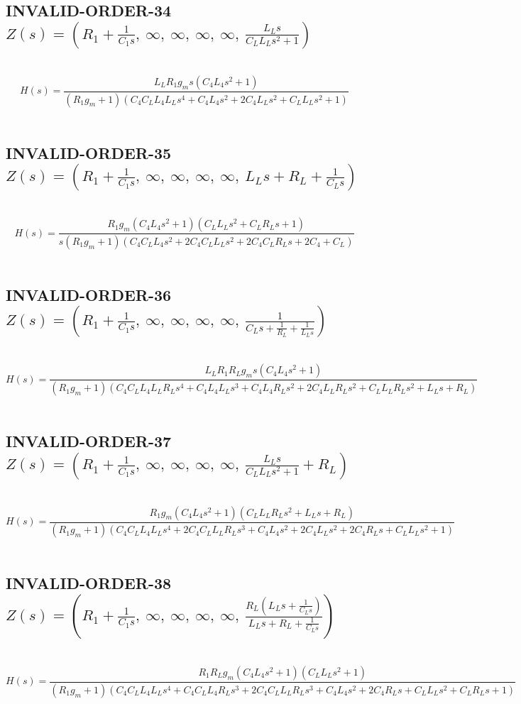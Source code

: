 \documentclass{article}
\begin{document}
\subsection{INVALID-ORDER-34 $Z(s) = \left( R_{1} + \frac{1}{C_{1} s}, \  \infty, \  \infty, \  \infty, \  \infty, \  \frac{L_{L} s}{C_{L} L_{L} s^{2} + 1}\right)$ } \ 
\textbf{\[H(s) = \frac{L_{L} R_{1} g_{m} s \left(C_{4} L_{4} s^{2} + 1\right)}{\left(R_{1} g_{m} + 1\right) \left(C_{4} C_{L} L_{4} L_{L} s^{4} + C_{4} L_{4} s^{2} + 2 C_{4} L_{L} s^{2} + C_{L} L_{L} s^{2} + 1\right)}\] } \ 
\subsection{INVALID-ORDER-35 $Z(s) = \left( R_{1} + \frac{1}{C_{1} s}, \  \infty, \  \infty, \  \infty, \  \infty, \  L_{L} s + R_{L} + \frac{1}{C_{L} s}\right)$ } \ 
\textbf{\[H(s) = \frac{R_{1} g_{m} \left(C_{4} L_{4} s^{2} + 1\right) \left(C_{L} L_{L} s^{2} + C_{L} R_{L} s + 1\right)}{s \left(R_{1} g_{m} + 1\right) \left(C_{4} C_{L} L_{4} s^{2} + 2 C_{4} C_{L} L_{L} s^{2} + 2 C_{4} C_{L} R_{L} s + 2 C_{4} + C_{L}\right)}\] } \ 
\subsection{INVALID-ORDER-36 $Z(s) = \left( R_{1} + \frac{1}{C_{1} s}, \  \infty, \  \infty, \  \infty, \  \infty, \  \frac{1}{C_{L} s + \frac{1}{R_{L}} + \frac{1}{L_{L} s}}\right)$ } \ 
\textbf{\[H(s) = \frac{L_{L} R_{1} R_{L} g_{m} s \left(C_{4} L_{4} s^{2} + 1\right)}{\left(R_{1} g_{m} + 1\right) \left(C_{4} C_{L} L_{4} L_{L} R_{L} s^{4} + C_{4} L_{4} L_{L} s^{3} + C_{4} L_{4} R_{L} s^{2} + 2 C_{4} L_{L} R_{L} s^{2} + C_{L} L_{L} R_{L} s^{2} + L_{L} s + R_{L}\right)}\] } \ 
\subsection{INVALID-ORDER-37 $Z(s) = \left( R_{1} + \frac{1}{C_{1} s}, \  \infty, \  \infty, \  \infty, \  \infty, \  \frac{L_{L} s}{C_{L} L_{L} s^{2} + 1} + R_{L}\right)$ } \ 
\textbf{\[H(s) = \frac{R_{1} g_{m} \left(C_{4} L_{4} s^{2} + 1\right) \left(C_{L} L_{L} R_{L} s^{2} + L_{L} s + R_{L}\right)}{\left(R_{1} g_{m} + 1\right) \left(C_{4} C_{L} L_{4} L_{L} s^{4} + 2 C_{4} C_{L} L_{L} R_{L} s^{3} + C_{4} L_{4} s^{2} + 2 C_{4} L_{L} s^{2} + 2 C_{4} R_{L} s + C_{L} L_{L} s^{2} + 1\right)}\] } \ 
\subsection{INVALID-ORDER-38 $Z(s) = \left( R_{1} + \frac{1}{C_{1} s}, \  \infty, \  \infty, \  \infty, \  \infty, \  \frac{R_{L} \left(L_{L} s + \frac{1}{C_{L} s}\right)}{L_{L} s + R_{L} + \frac{1}{C_{L} s}}\right)$ } \ 
\textbf{\[H(s) = \frac{R_{1} R_{L} g_{m} \left(C_{4} L_{4} s^{2} + 1\right) \left(C_{L} L_{L} s^{2} + 1\right)}{\left(R_{1} g_{m} + 1\right) \left(C_{4} C_{L} L_{4} L_{L} s^{4} + C_{4} C_{L} L_{4} R_{L} s^{3} + 2 C_{4} C_{L} L_{L} R_{L} s^{3} + C_{4} L_{4} s^{2} + 2 C_{4} R_{L} s + C_{L} L_{L} s^{2} + C_{L} R_{L} s + 1\right)}\] } \ 
\end{document}
